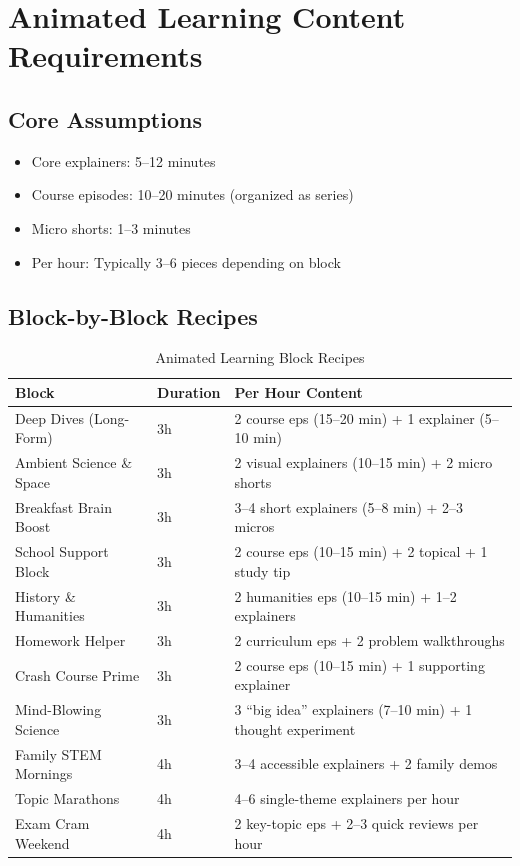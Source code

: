 \documentclass[12pt,letterpaper,twoside]{report}
\begin{document}
\section{Animated Learning Content Requirements}

\subsection{Core Assumptions}

\begin{itemize}[leftmargin=1.5cm]
    \item Core explainers: 5--12 minutes
    \item Course episodes: 10--20 minutes (organized as series)
    \item Micro shorts: 1--3 minutes
    \item Per hour: Typically 3--6 pieces depending on block
\end{itemize}

\subsection{Block-by-Block Recipes}

\begin{table}[H]
\centering
\caption{Animated Learning Block Recipes}
\label{tab:learning-recipes}
\begin{tabular}{@{}L{4cm}L{2cm}L{7.5cm}@{}}
\toprule
\textbf{Block} & \textbf{Duration} & \textbf{Per Hour Content} \\
\midrule
Deep Dives (Long-Form) & 3h & 2 course eps (15--20 min) + 1 explainer (5--10 min) \\
Ambient Science \& Space & 3h & 2 visual explainers (10--15 min) + 2 micro shorts \\
Breakfast Brain Boost & 3h & 3--4 short explainers (5--8 min) + 2--3 micros \\
School Support Block & 3h & 2 course eps (10--15 min) + 2 topical + 1 study tip \\
History \& Humanities & 3h & 2 humanities eps (10--15 min) + 1--2 explainers \\
Homework Helper & 3h & 2 curriculum eps + 2 problem walkthroughs \\
Crash Course Prime & 3h & 2 course eps (10--15 min) + 1 supporting explainer \\
Mind-Blowing Science & 3h & 3 ``big idea'' explainers (7--10 min) + 1 thought experiment \\
Family STEM Mornings & 4h & 3--4 accessible explainers + 2 family demos \\
Topic Marathons & 4h & 4--6 single-theme explainers per hour \\
Exam Cram Weekend & 4h & 2 key-topic eps + 2--3 quick reviews per hour \\
\bottomrule
\end{tabular}
\end{table}
\end{document}

